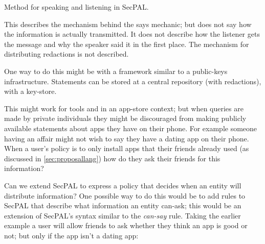 \documentclass[a4paper,sfsidenotes]{%
  article%
}
\begin{document}
\begin{marginfigure}
  \begin{algorithm}[H]
    \;

  \end{algorithm}
  \caption{Method for speaking and listening in SecPAL.}
  \label{alg:speaking}
\end{marginfigure}

This describes the mechanism behind the says mechanic; but does not say how the
information is actually transmitted.  It does not describe how the listener gets
the message and why the speaker said it in the first place.
The mechanism for distributing redactions is not described. 

One way to do this
might be with a framework similar to a public-keys infrastructure.
Statements can be stored at a central repository (with redactions), with a
key-store.  

This might work for tools and in an app-store context; but when queries are made
by private individuals they might be discouraged from making publicly available
statements about apps they have on their phone.  For example someone having an
affair might not wish to say they have a dating app on their phone.  When a
user's policy is to only install apps that their friends already used (as
discussed in \autoref{sec:proposallang}) how do they ask their friends for
this information?  

Can we extend SecPAL to express a policy that decides when an
entity will distribute information?
One possible way to do this would be to add rules to SecPAL that describe what
information an entity can-ask; this would be an extension of SecPAL's syntax
similar to the \emph{can-say} rule.  Taking the earlier example a user will allow
friends to ask whether they think an app is good or not; but only if the app
isn't a dating app:
\end{document}
